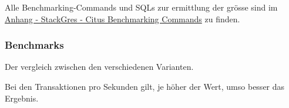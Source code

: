 \begin{flushleft}
    Alle Benchmarking-Commands und SQLs zur ermittlung der grösse sind im \hyperref[subsec:stackgres_citus_benchmarking_commands]{Anhang - StackGres - Citus Benchmarking Commands} zu finden.
    \subsubsection{Benchmarks}
    Der vergleich zwischen den verschiedenen Varianten.\\
\end{flushleft}
\begin{flushleft}

\end{flushleft}
\begin{flushleft}
    Bei den Transaktionen pro Sekunden gilt, je höher der Wert, umso besser das Ergebnis.\\
%


\end{flushleft}
